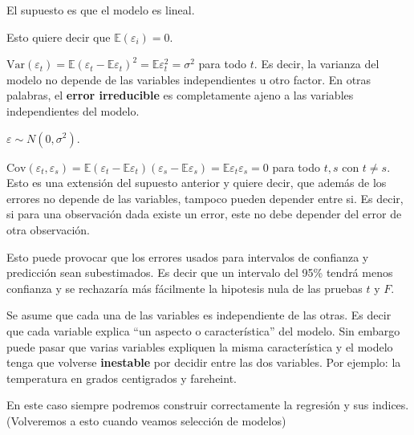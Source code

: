 \documentclass[
  12pt,
]{book}
\providecommand{\tightlist}{%
  \setlength{\itemsep}{0pt}\setlength{\parskip}{0pt}}
\theoremstyle{definition}
\theoremstyle{definition}
\theoremstyle{definition}
\theoremstyle{remark}
\begin{document}
\begin{description}
\tightlist
\item[Independencia lineal]
El supuesto es que el modelo es lineal.
\item[Errores con esperanza nula]
Esto quiere decir que \(\mathbb{E}(\varepsilon_i) = 0\).
\item[Homocedasticidad]
\(\text{Var}(\varepsilon_t) = \mathbb{E}(\varepsilon_t - \mathbb{E} \varepsilon_t)^2 = \mathbb{E} \varepsilon_t^2 = \sigma^2\) para todo \(t\). Es decir, la varianza del modelo no depende de las variables independientes u otro factor. En otras palabras, el \textbf{error irreducible} es completamente ajeno a las variables independientes del modelo.
\item[Normalidad de los residuos]
\(\varepsilon \sim N(0, \sigma^2 )\).
\item[Independencia de los erroes]
\(\text{Cov}(\varepsilon_t,\varepsilon_s ) = \mathbb{E} (\varepsilon_t - \mathbb{E} \varepsilon_t) (\varepsilon_s - \mathbb{E} \varepsilon_s) = \mathbb{E} \varepsilon_t \varepsilon_s = 0\) para todo \(t,s\) con \(t\neq s\). Esto es una extensión del supuesto anterior y quiere decir, que además de los errores no depende de las variables, tampoco pueden depender entre si. Es decir, si para una observación dada existe un error, este no debe depender del error de otra observación.
\end{description}

Esto puede provocar que los errores usados para intervalos de confianza y predicción sean subestimados. Es decir que un intervalo del 95\% tendrá menos confianza y se rechazaría más fácilmente la hipotesis nula de las pruebas \(t\) y \(F\).

\begin{description}
\tightlist
\item[Multicolineaidad]
Se asume que cada una de las variables es independiente de las otras. Es decir que cada variable explica \enquote{un aspecto o característica} del modelo. Sin embargo puede pasar que varias variables expliquen la misma característica y el modelo tenga que volverse \textbf{inestable} por decidir entre las dos variables. Por ejemplo: la temperatura en grados centigrados y fareheint.
\item[Más observaciones que predictores]
En este caso siempre podremos construir correctamente la regresión y sus indices. (Volveremos a esto cuando veamos selección de modelos)
\end{description}
\end{document}
